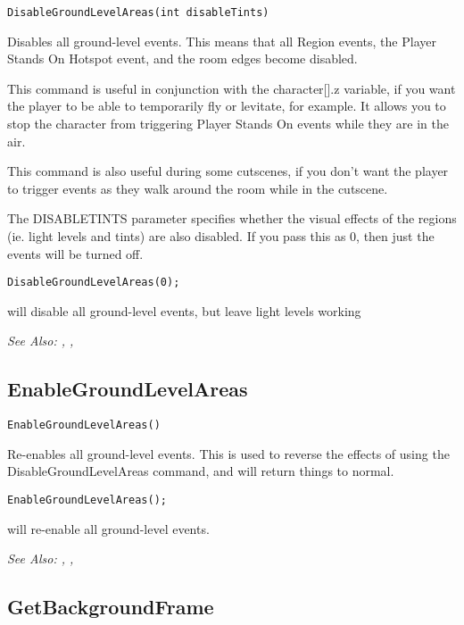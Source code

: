 \begin{verbatim}
DisableGroundLevelAreas(int disableTints)
\end{verbatim}
Disables all ground-level events. This means that all Region events, the Player Stands
On Hotspot event, and the room edges become disabled.

This command is useful in conjunction with the character[].z variable, if you want the player
to be able to temporarily fly or levitate, for example. It allows you to stop the character
from triggering Player Stands On events while they are in the air.

This command is also useful during some cutscenes, if you don't want the player to trigger
events as they walk around the room while in the cutscene.

The DISABLETINTS parameter specifies whether the visual effects of the regions (ie. light
levels and tints) are also disabled. If you pass this as 0, then just the events will
be turned off.

\begin{verbatim}
DisableGroundLevelAreas(0);
\end{verbatim}
will disable all ground-level events, but leave light levels working

\it{See Also:} , ,


\subsection{EnableGroundLevelAreas}\label{EnableGroundLevelAreas}%

\begin{verbatim}
EnableGroundLevelAreas()
\end{verbatim}
Re-enables all ground-level events. This is used to reverse the effects of
using the DisableGroundLevelAreas command, and will return things to normal.

\begin{verbatim}
EnableGroundLevelAreas();
\end{verbatim}
will re-enable all ground-level events.

\it{See Also:} , ,


\subsection{GetBackgroundFrame}\label{GetBackgroundFrame}%


